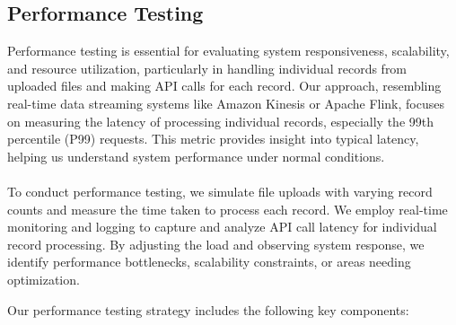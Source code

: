 \documentclass[12pt,a4paper]{report}
\begin{document}
\subsection{Performance Testing}

Performance testing is essential for evaluating system responsiveness, scalability, and resource utilization, particularly in handling individual records from uploaded files and making API calls for each record. Our approach, resembling real-time data streaming systems like Amazon Kinesis or Apache Flink, focuses on measuring the latency of processing individual records, especially the 99th percentile (P99) requests. This metric provides insight into typical latency, helping us understand system performance under normal conditions.
\\\\
\noindent To conduct performance testing, we simulate file uploads with varying record counts and measure the time taken to process each record. We employ real-time monitoring and logging to capture and analyze API call latency for individual record processing. By adjusting the load and observing system response, we identify performance bottlenecks, scalability constraints, or areas needing optimization.

Our performance testing strategy includes the following key components:
\end{document}

